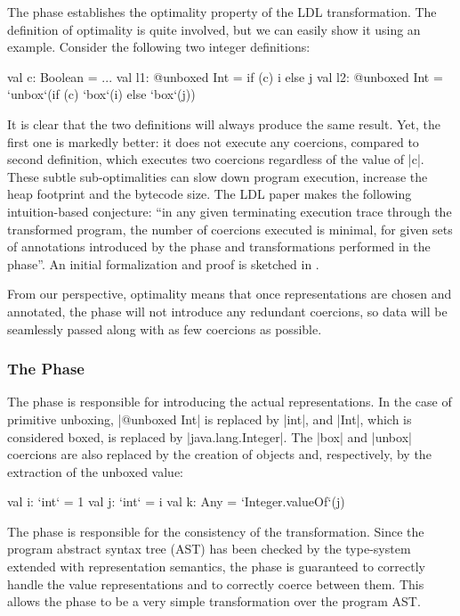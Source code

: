 The \coerce{} phase establishes the optimality property of the LDL transformation. The definition of optimality is quite involved, but we can easily show it using an example. Consider the following two integer definitions:

\begin{lstlisting-nobreak}
val c: Boolean = ...
val l1: @unboxed Int = if (c) i else j
val l2: @unboxed Int = `unbox`(if (c) `box`(i) else `box`(j))
\end{lstlisting-nobreak}

It is clear that the two definitions will always produce the same result. Yet, the first one is markedly better: it does not execute any coercions, compared to second definition, which executes two coercions regardless of the value of |c|. These subtle sub-optimalities can slow down program execution, increase the heap footprint and the bytecode size. The LDL paper \cite{ldl} makes the following intuition-based conjecture: ``in any given terminating execution trace through the transformed program, the number of coercions executed is minimal, for given sets of annotations introduced by the \inject{} phase and transformations performed in the \commit{} phase''. An initial formalization and proof is sketched in \cite{ldl-form}.

From our perspective, optimality means that once representations are chosen and annotated, the \coerce{} phase will not introduce any redundant coercions, so data will be seamlessly passed along with as few coercions as possible.


\subsubsection*{The \Commit{} Phase}

The \commit{} phase is responsible for introducing the actual representations. In the case of primitive unboxing, |@unboxed Int| is replaced by |int|, and |Int|, which is considered boxed, is replaced by |java.lang.Integer|. The |box| and |unbox| coercions are also replaced by the creation of objects and, respectively, by the extraction of the unboxed value:


\begin{lstlisting-nobreak}
val i: `int` = 1
val j: `int` = i
val k: Any = `Integer.valueOf`(j)
\end{lstlisting-nobreak}

The \commit{} phase is responsible for the consistency of the transformation. Since the program abstract syntax tree (AST) has been checked by the type-system extended with representation semantics, the \commit{} phase is guaranteed to correctly handle the value representations and to correctly coerce between them. This allows the \commit{} phase to be a very simple transformation over the program AST.

